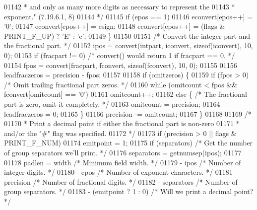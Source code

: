 \begin{DoxyCode}
{{{{{{{{{{01142 \textcolor{comment}{         * and only as many more digits as necessary to represent the}
01143 \textcolor{comment}{         * exponent." (7.19.6.1, 8)}
01144 \textcolor{comment}{         */}
01145         \textcolor{keywordflow}{if} (epos == 1)
01146             econvert[epos++] = \textcolor{charliteral}{'0'};
01147         econvert[epos++] = esign;
01148         econvert[epos++] = (flags & PRINT\_F\_UP) ? \textcolor{charliteral}{'E'} : \textcolor{charliteral}{'e'};
01149     \}
01150 
01151     \textcolor{comment}{/* Convert the integer part and the fractional part. */}
01152     ipos = convert(intpart, iconvert, \textcolor{keyword}{sizeof}(iconvert), 10, 0);
01153     \textcolor{keywordflow}{if} (fracpart != 0)  \textcolor{comment}{/* convert() would return 1 if fracpart == 0. */}
01154         fpos = convert(fracpart, fconvert, \textcolor{keyword}{sizeof}(fconvert), 10, 0);
01155 
01156     leadfraczeros = precision - fpos;
01157 
01158     \textcolor{keywordflow}{if} (omitzeros) \{
01159         \textcolor{keywordflow}{if} (fpos > 0)   \textcolor{comment}{/* Omit trailing fractional part zeros. */}
01160             \textcolor{keywordflow}{while} (omitcount < fpos && fconvert[omitcount] == \textcolor{charliteral}{'0'})
01161                 omitcount++;
01162         \textcolor{keywordflow}{else} \{  \textcolor{comment}{/* The fractional part is zero, omit it completely. */}
01163             omitcount = precision;
01164             leadfraczeros = 0;
01165         \}
01166         precision -= omitcount;
01167     \}
01168 
01169     \textcolor{comment}{/*}
01170 \textcolor{comment}{     * Print a decimal point if either the fractional part is non-zero}
01171 \textcolor{comment}{     * and/or the "#" flag was specified.}
01172 \textcolor{comment}{     */}
01173     \textcolor{keywordflow}{if} (precision > 0 || flags & PRINT\_F\_NUM)
01174         emitpoint = 1;
01175     \textcolor{keywordflow}{if} (separators) \textcolor{comment}{/* Get the number of group separators we'll print. */}
01176         separators = getnumsep(ipos);
01177 
01178     padlen = width                  \textcolor{comment}{/* Minimum field width. */}
01179         - ipos                      \textcolor{comment}{/* Number of integer digits. */}
01180         - epos                      \textcolor{comment}{/* Number of exponent characters. */}
01181         - precision                 \textcolor{comment}{/* Number of fractional digits. */}
01182         - separators                \textcolor{comment}{/* Number of group separators. */}
01183         - (emitpoint ? 1 : 0)       \textcolor{comment}{/* Will we print a decimal point? */}
}}}}}}}}}}
\end{DoxyCode}
